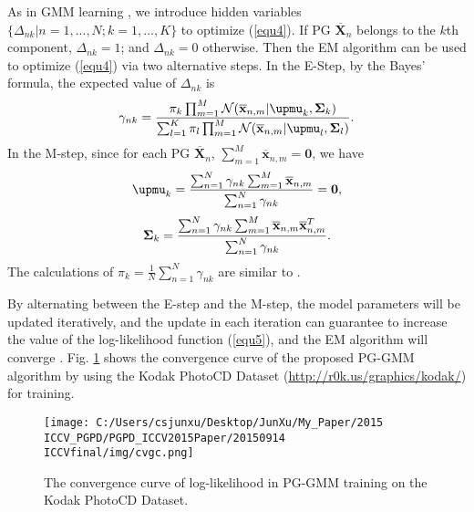 As in GMM learning \cite{Bishop}, we introduce hidden variables $\{\Delta_{nk}|n=1,...,N;k=1,...,K\}$ to optimize (\ref{equ4}). If PG $\mathbf{\overline{X}}_{n}$ belongs to the $k$th component, $\Delta_{nk}=1$; and $\Delta_{nk}=0$ otherwise. Then the EM algorithm \cite{em} can be used to optimize (\ref{equ4}) via two alternative steps. In the E-Step, by the Bayes' formula, the expected value of $\Delta_{nk}$ is
\begin{equation}\label{equ5}
\setlength{\abovedisplayskip}{3pt}
\setlength{\belowdisplayskip}{3pt}
\gamma_{nk}=\frac{\pi_{k}\prod_{m=1}^{M}\mathcal{N}(\mathbf{\overline{x}}_{n,m}|\boldsymbol{\upmu}_{k},\mathbf{\Sigma}_{k})}{\sum_{l=1}^{K}\pi_{l}\prod_{m=1}^{M}\mathcal{N}(\mathbf{\overline{x}}_{n,m}|\boldsymbol{\upmu}_{l},\mathbf{\Sigma}_{l})}.
\end{equation}
In the M-step, since for each PG $\mathbf{\overline{X}}_{n}$, $\sum_{m=1}^{M}\mathbf{\overline{x}}_{n,m}=\mathbf{0}$, we have
\begin{equation}\label{equ6}
\setlength{\abovedisplayskip}{3pt}
\setlength{\belowdisplayskip}{3pt}
\boldsymbol{\upmu}_{k} = \frac{\sum_{n=1}^{N}\gamma_{nk}\sum_{m=1}^{M}\mathbf{\overline{x}}_{n,m}}{\sum_{n=1}^{N}\gamma_{nk}}=\mathbf{0},
\end{equation}
\begin{equation}\label{equ7}
\setlength{\abovedisplayskip}{3pt}
\setlength{\belowdisplayskip}{3pt}
\mathbf{\Sigma}_{k} = \frac{\sum_{n=1}^{N}\gamma_{nk}\sum_{m=1}^{M}\mathbf{\overline{x}}_{n,m}\mathbf{\overline{x}}_{n,m}^{T}}{\sum_{n=1}^{N}\gamma_{nk}}.
\end{equation}
The calculations of $\pi_{k}=\frac{1}{N}\sum_{n=1}^{N}\gamma_{nk}$ are similar to \cite{Bishop}.

By alternating between the E-step and the M-step, the model parameters will be updated iteratively, and the update in each iteration can guarantee to increase the value of the log-likelihood function (\ref{equ5}), and the EM algorithm will converge \cite{Bishop,emconvergence}. Fig. \ref{fig3} shows the convergence curve of the proposed PG-GMM algorithm by using the Kodak PhotoCD Dataset (\url{http://r0k.us/graphics/kodak/}) for training.
\begin{figure}[t]
\centering
\texttt{[image: C:/Users/csjunxu/Desktop/JunXu/My\_Paper/2015 ICCV\_PGPD/PGPD\_ICCV2015Paper/20150914 ICCVfinal/img/cvgc.png]}
\vspace{-0.05in}
\caption{The convergence curve of log-likelihood in PG-GMM training on the Kodak PhotoCD Dataset.
}
\vspace{-0.2in}
\label{fig3}
\end{figure}

